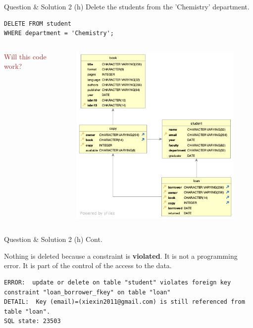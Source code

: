 \begin{frame}[fragile]{Question \& Solution 2 (h)}
Delete the students from the 'Chemistry' department.

\begin{lstlisting}
DELETE FROM student 
WHERE department = 'Chemistry';
\end{lstlisting}

\begin{columns}
	\textcolor{brown}{Will this code work?}
	\begin{figure}
		\includegraphics[width=1\textwidth]{t1/images/t1-0.png}
	\end{figure}
\end{columns}
\end{frame}

\begin{frame}[fragile]{Question \& Solution 2 (h) Cont.}

Nothing is deleted because a constraint is \textbf{violated}. It is not a programming error. It is part of the control of the access to the data.
\begin{lstlisting}[style=error]
ERROR:  update or delete on table "student" violates foreign key constraint "loan_borrower_fkey" on table "loan"
DETAIL:  Key (email)=(xiexin2011@gmail.com) is still referenced from table "loan".
SQL state: 23503
\end{lstlisting}
\end{frame}


